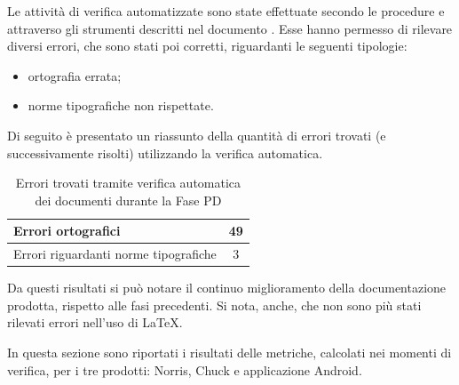 			Le attività di verifica automatizzate sono state effettuate secondo le procedure e attraverso gli strumenti descritti nel documento . Esse hanno permesso di rilevare diversi errori, che sono stati poi corretti, riguardanti le seguenti tipologie:
			\begin{itemize}
				\item ortografia errata;
				\item norme tipografiche non rispettate.
			\end{itemize}
			Di seguito è presentato un riassunto della quantità di errori trovati (e successivamente risolti) utilizzando la verifica automatica.	
			\begin{table}[H]
				\centering
					\begin{tabu}{| l | c |}
						\hline
						Errori ortografici	& 49	\\ \hline
						Errori riguardanti norme tipografiche	& 3	\\ \hline
					\end{tabu}
				\caption{Errori trovati tramite verifica automatica dei documenti durante la Fase PD}
			\end{table}
			Da questi risultati si può notare il continuo miglioramento della documentazione prodotta, rispetto alle fasi precedenti. Si nota, anche, che non sono più stati rilevati errori nell'uso di \LaTeX{}.

		In questa sezione sono riportati i risultati delle metriche, calcolati nei momenti di verifica, per i tre prodotti: Norris, Chuck e applicazione Android.

